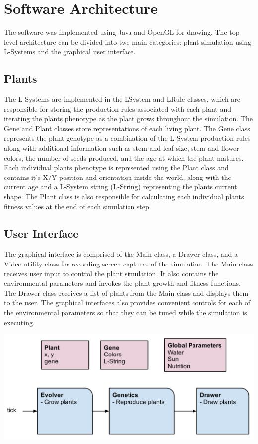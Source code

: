 \documentclass[conference]{acmsiggraph}
\begin{document}
\section{Software Architecture}

The software was implemented using Java and OpenGL for drawing. The top-level
architecture can be divided into two main categories: plant simulation using
L-Systems and the graphical user interface.

\subsection{Plants}

The L-Systems are implemented in the LSystem and LRule classes, which are
responsible for storing the production rules associated with each plant and
iterating the plants phenotype as the plant grows throughout the simulation. The
Gene and Plant classes store representations of each living plant. The Gene
class represents the plant genotype as a combination of the L-System production
rules along with additional information such as stem and leaf size, stem and
flower colors, the number of seeds produced, and the age at which the plant
matures. Each individual plants phenotype is represented using the Plant class
and contains it's X/Y position and orientation inside the world, along with the
current age and a L-System string (L-String) representing the plants current
shape. The Plant class is also responsible for calculating each individual
plants fitness values at the end of each simulation step.

\subsection{User Interface}

The graphical interface is comprised of the Main class, a Drawer class, and a
Video utility class for recording screen captures of the simulation. The Main
class receives user input to control the plant simulation. It also contains the
environmental parameters and invokes the plant growth and fitness functions. The
Drawer class receives a list of plants from the Main class and displays them to
the user. The graphical interfaces also provides convenient controls for each of
the environmental parameters so that they can be tuned while the simulation is
executing.

\includegraphics[width=\columnwidth]{images/architecture.png}
\end{document}
